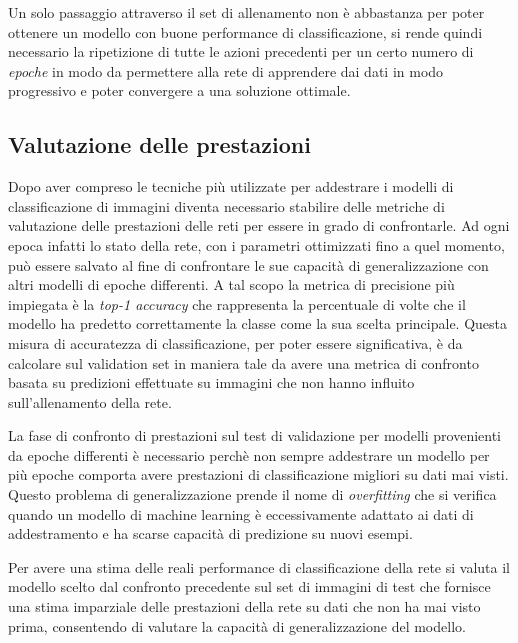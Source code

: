 Un solo passaggio attraverso il set di allenamento non è abbastanza per poter ottenere un modello con buone performance di classificazione, si rende quindi necessario la ripetizione di tutte le azioni precedenti per un certo numero di \textit{epoche} in modo da permettere alla rete di apprendere dai dati in modo progressivo e poter convergere a una soluzione ottimale.

\subsection{Valutazione delle prestazioni}

Dopo aver compreso le tecniche più utilizzate per addestrare i modelli di classificazione di immagini diventa necessario stabilire delle metriche di valutazione delle prestazioni delle reti per essere in grado di confrontarle. Ad ogni epoca infatti lo stato della rete, con i parametri ottimizzati fino a quel momento, può essere salvato al fine di confrontare le sue capacità di generalizzazione con altri modelli di epoche differenti. A tal scopo la metrica di precisione più impiegata è la \textit{top-1 accuracy} che rappresenta la percentuale di volte che il modello ha predetto correttamente la classe come la sua scelta principale. Questa misura di accuratezza di classificazione, per poter essere significativa, è da calcolare sul validation set in maniera tale da avere una metrica di confronto basata su predizioni effettuate su immagini che non hanno influito sull'allenamento della rete.

La fase di confronto di prestazioni sul test di validazione per modelli provenienti da epoche differenti è necessario perchè non sempre addestrare un modello per più epoche comporta avere prestazioni di classificazione migliori su dati mai visti. Questo problema di generalizzazione prende il nome di \textit{overfitting} che si verifica quando un modello di machine learning è eccessivamente adattato ai dati di addestramento e ha scarse capacità di predizione su nuovi esempi. 

Per avere una stima delle reali performance di classificazione della rete si valuta il modello scelto dal confronto precedente sul set di immagini di test che fornisce una stima imparziale delle prestazioni della rete su dati che non ha mai visto prima, consentendo di valutare la capacità di generalizzazione del modello.

